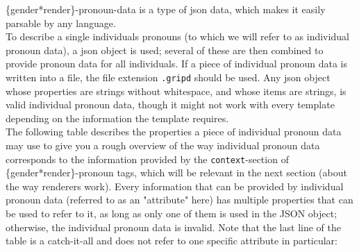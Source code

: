 \documentclass{article}
\begin{document}
    \{gender*render\}-pronoun-data is a type of json data, which makes it easily parsable by any language.\\

    To describe a single individuals pronouns (to which we will refer to as individual pronoun data), a json object is used;
    several of these are then combined to provide pronoun data for all individuals.
    If a piece of individual pronoun data is written into a file, the file extension \texttt{.gripd} should be used.
    Any json object whose properties are strings without whitespace, and whose items are strings, is valid individual pronoun data, though it might not work with every template depending on the information the template requires.\\

    The following table describes the properties a piece of individual pronoun data may use to give you a rough overview of the way individual pronoun data corresponds to the information provided by the \texttt{context}-section of \{gender*render\}-pronoun tags, which will be relevant in the next section (about the way renderers work).
    Every information that can be provided by individual pronoun data (referred to as an "attribute" here) has multiple properties that can be used to refer to it, as long as only one of them is used in the JSON object;
   otherwise, the individual pronoun data is invalid.
    Note that the last line of the table is a catch-it-all and does not refer to one specific attribute in particular:
\end{document}
